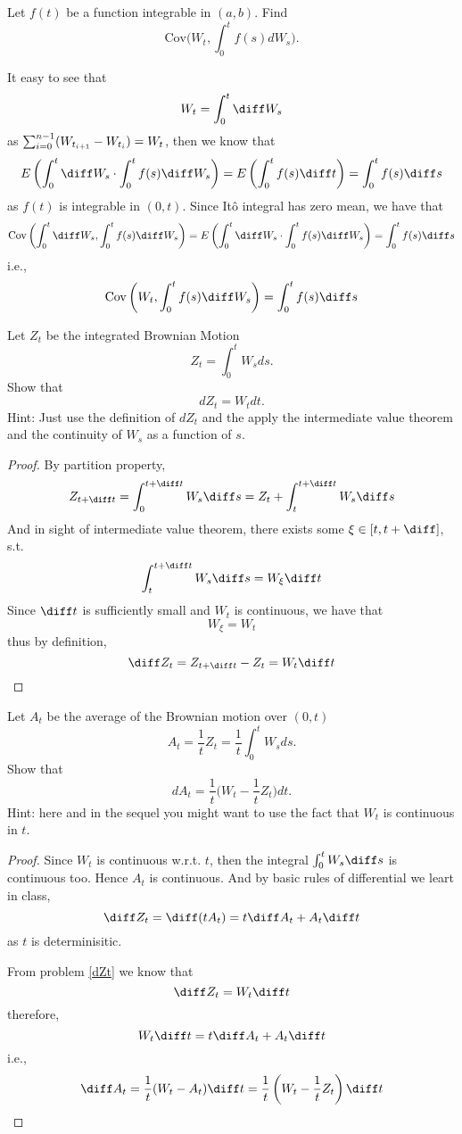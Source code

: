     \problem
    \begin{question}
        Let $f(t)$ be a function integrable in $(a,b)$.  Find
        \[\text{Cov}\Big(W_t,\int_0^t f(s)dW_s\Big).\] 
    \end{question}
    It easy to see that
    \[W_t=\int_0^t\diff W_s\]
    as $\sum_{i=0}^{n-1}(W_{t_{i+1}}-W_{t_i})=W_t$,
    then we know that
    \[E\left(\int_0^t\diff W_s\cdot\int_0^tf(s)\diff W_s\right)
    =E\left(\int_0^tf(s)\diff t\right)=\int_0^tf(s)\diff s\]
    as $f(t)$ is integrable in $(0,t)$.
    Since It\^o integral has zero mean, we have that
    \[\begin{aligned}
        \cov\left(\int_0^t\diff W_s,\int_0^tf(s)\diff W_s\right)
        =E\left(\int_0^t\diff W_s\cdot\int_0^tf(s)\diff W_s\right)
        =\int_0^tf(s)\diff s
    \end{aligned}\]
    i.e.,
    \[\cov\left(W_t,\int_0^tf(s)\diff W_s\right)=
    \int_0^tf(s)\diff s\]

    \problem
    \label{dZt}
    \begin{question}
        Let $Z_t$ be the integrated Brownian Motion
        \[Z_t=\int_0^t W_sds.\]
        Show that
        \[dZ_t=W_tdt.\]
        Hint:  Just use the definition of $dZ_t$ and the apply
        the intermediate value theorem and the continuity of $W_s$ as a function of $s$.
    \end{question}
    \begin{proof}
        By partition property,
        \[Z_{t+\diff t}=\int_0^{t+\diff t}W_s\diff s
        =Z_t+\int_t^{t+\diff t}W_s\diff s\]
        And in sight of intermediate value theorem, there exists some
        $\xi\in[t,t+\diff]$, s.t.
        \[\int_t^{t+\diff t}W_s\diff s
        =W_\xi\diff t\]
        Since $\diff t$ is sufficiently small and $W_t$ is continuous,
        we have that
        \[W_\xi=W_t\]
        thus by definition,
        \[\diff Z_t=Z_{t+\diff t}-Z_t=W_t\diff t\]
    \end{proof}

    \problem
    \label{pr:over dt}
    \begin{question}
        Let $A_t$ be the average of the Brownian motion over $(0,t)$
        \[A_t=\frac{1}{t}Z_t=\frac{1}{t}\int_0^t W_sds.\]
        Show that
        \[dA_t=\frac{1}{t}\Big(W_t-\frac{1}{t}Z_t\Big)dt.\]
        Hint: here and in the sequel you might want to use the fact that $W_t$
        is continuous in $t$.
    \end{question}
    \begin{proof}
        Since $W_t$ is continuous w.r.t. $t$, then the
        integral $\int_0^tW_s\diff s$ is continuous too.
        Hence $A_t$ is continuous. And by basic rules of
        differential we leart in class,
        \[\diff Z_t=\diff(tA_t)=t\diff A_t+A_t\diff t\]
        as $t$ is determinisitic.

        From problem \ref{dZt} we know that
        \[\diff Z_t=W_t\diff t\]
        therefore,
        \[W_t\diff t=t\diff A_t+A_t\diff t\]
        i.e.,
        \[\diff A_t=\frac{1}{t}(W_t-A_t)\diff t
        =\frac{1}{t}\left(W_t-\frac{1}{t}Z_t\right)\diff t\]
    \end{proof}


